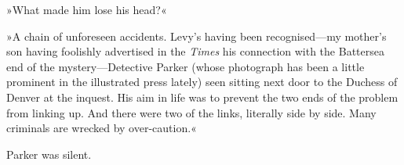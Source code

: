 »What made him lose his head?«

»A chain of unforeseen accidents. Levy's having been recognised\allowbreak---\allowbreak my mother's son having foolishly advertised in the \textit{Times} his connection with the Battersea end of the mystery\allowbreak---\allowbreak Detective Parker (whose photograph has been a little prominent in the illustrated press lately) seen sitting next door to the Duchess of Denver at the inquest. His aim in life was to prevent the two ends of the problem from linking up. And there were two of the links, literally side by side. Many criminals are wrecked by over-caution.«

Parker was silent.